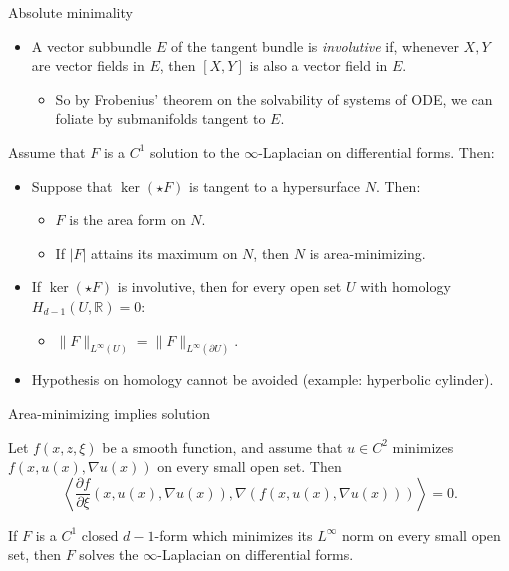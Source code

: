 \documentclass[10pt]{beamer}
\newcommand{\RR}{\mathbb{R}}
\begin{document}
\begin{frame}{Absolute minimality}
\begin{itemize}
\item A vector subbundle $E$ of the tangent bundle is \emph{involutive} if, whenever $X, Y$ are vector fields in $E$, then $[X, Y]$ is also a vector field in $E$.
\begin{itemize}
\item So by Frobenius' theorem on the solvability of systems of ODE, we can foliate by submanifolds tangent to $E$. \pause
\end{itemize}
\end{itemize}

\begin{theorem}
Assume that $F$ is a $C^1$ solution to the $\infty$-Laplacian on differential forms.
Then: \pause
\begin{itemize}
\item Suppose that $\ker(\star F)$ is tangent to a hypersurface $N$. Then:
\begin{itemize}
\item $F$ is the area form on $N$.
\item If $|F|$ attains its maximum on $N$, then $N$ is area-minimizing. \pause
\end{itemize}
\item If $\ker(\star F)$ is involutive, then for every open set $U$ with homology $H_{d - 1}(U, \RR) = 0$:
\begin{itemize}
\item $\|F\|_{L^\infty(U)} = \|F\|_{L^\infty(\partial U)}$. \pause 
\end{itemize} 
\end{itemize}
\end{theorem}

\begin{itemize}
\item Hypothesis on homology cannot be avoided (example: hyperbolic cylinder).
\end{itemize}

\end{frame}

\begin{frame}{Area-minimizing implies solution}    
\begin{theorem}
Let $f(x, z, \xi)$ be a smooth function, and assume that $u \in C^2$ minimizes $f(x, u(x), \nabla u(x))$ on every small open set.
Then
$$\left\langle \frac{\partial f}{\partial \xi}(x, u(x), \nabla u(x)), \nabla(f(x, u(x), \nabla u(x)))\right\rangle = 0.$$
\end{theorem}

\begin{corollary}
If $F$ is a $C^1$ closed $d - 1$-form which minimizes its $L^\infty$ norm on every small open set, then $F$ solves the $\infty$-Laplacian on differential forms.
\end{corollary}
\end{frame}
\end{document}
